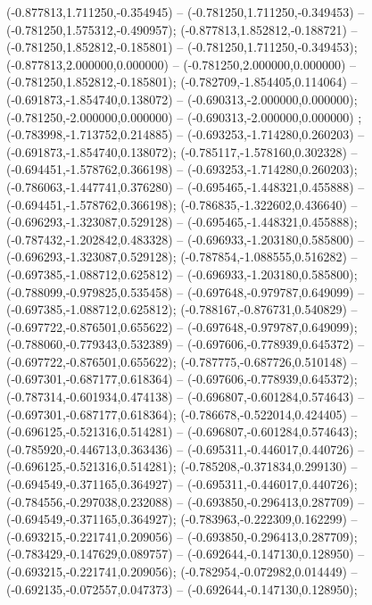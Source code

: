  (-0.877813,1.711250,-0.354945) -- (-0.781250,1.711250,-0.349453) -- (-0.781250,1.575312,-0.490957);
 (-0.877813,1.852812,-0.188721) -- (-0.781250,1.852812,-0.185801) -- (-0.781250,1.711250,-0.349453);
 (-0.877813,2.000000,0.000000) -- (-0.781250,2.000000,0.000000) -- (-0.781250,1.852812,-0.185801);
 (-0.782709,-1.854405,0.114064) -- (-0.691873,-1.854740,0.138072) -- (-0.690313,-2.000000,0.000000);
 (-0.781250,-2.000000,0.000000) -- (-0.690313,-2.000000,0.000000) ;
 (-0.783998,-1.713752,0.214885) -- (-0.693253,-1.714280,0.260203) -- (-0.691873,-1.854740,0.138072);
 (-0.785117,-1.578160,0.302328) -- (-0.694451,-1.578762,0.366198) -- (-0.693253,-1.714280,0.260203);
 (-0.786063,-1.447741,0.376280) -- (-0.695465,-1.448321,0.455888) -- (-0.694451,-1.578762,0.366198);
 (-0.786835,-1.322602,0.436640) -- (-0.696293,-1.323087,0.529128) -- (-0.695465,-1.448321,0.455888);
 (-0.787432,-1.202842,0.483328) -- (-0.696933,-1.203180,0.585800) -- (-0.696293,-1.323087,0.529128);
 (-0.787854,-1.088555,0.516282) -- (-0.697385,-1.088712,0.625812) -- (-0.696933,-1.203180,0.585800);
 (-0.788099,-0.979825,0.535458) -- (-0.697648,-0.979787,0.649099) -- (-0.697385,-1.088712,0.625812);
 (-0.788167,-0.876731,0.540829) -- (-0.697722,-0.876501,0.655622) -- (-0.697648,-0.979787,0.649099);
 (-0.788060,-0.779343,0.532389) -- (-0.697606,-0.778939,0.645372) -- (-0.697722,-0.876501,0.655622);
 (-0.787775,-0.687726,0.510148) -- (-0.697301,-0.687177,0.618364) -- (-0.697606,-0.778939,0.645372);
 (-0.787314,-0.601934,0.474138) -- (-0.696807,-0.601284,0.574643) -- (-0.697301,-0.687177,0.618364);
 (-0.786678,-0.522014,0.424405) -- (-0.696125,-0.521316,0.514281) -- (-0.696807,-0.601284,0.574643);
 (-0.785920,-0.446713,0.363436) -- (-0.695311,-0.446017,0.440726) -- (-0.696125,-0.521316,0.514281);
 (-0.785208,-0.371834,0.299130) -- (-0.694549,-0.371165,0.364927) -- (-0.695311,-0.446017,0.440726);
 (-0.784556,-0.297038,0.232088) -- (-0.693850,-0.296413,0.287709) -- (-0.694549,-0.371165,0.364927);
 (-0.783963,-0.222309,0.162299) -- (-0.693215,-0.221741,0.209056) -- (-0.693850,-0.296413,0.287709);
 (-0.783429,-0.147629,0.089757) -- (-0.692644,-0.147130,0.128950) -- (-0.693215,-0.221741,0.209056);
 (-0.782954,-0.072982,0.014449) -- (-0.692135,-0.072557,0.047373) -- (-0.692644,-0.147130,0.128950);
